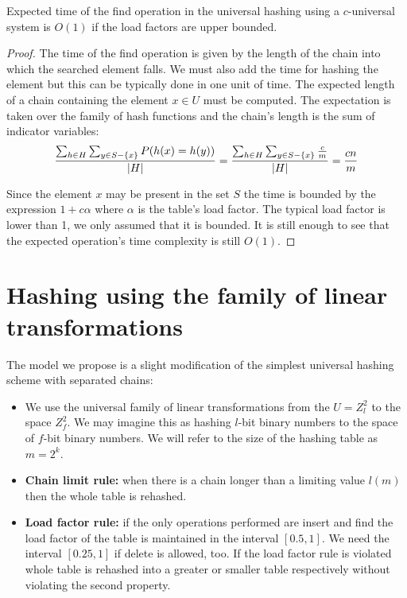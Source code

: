 \begin{theorem}
\label{theorem-expected-chain-length-universal}
Expected time of the find operation in the universal hashing using a $c$-universal system is $O(1)$ if the load factors are upper bounded.
\end{theorem}
\begin{proof}
The time of the find operation is given by the length of the chain into which the searched element falls. We must also add the time for hashing the element but this can be typically done in one unit of time. The expected length of a chain containing the element $x \in U$ must be computed. The expectation is taken over the family of hash functions and the chain's length is the sum of indicator variables:
\begin{displaymath}
\frac{\sum\displaylimits_{h \in H} \sum\displaylimits_{y \in S - \lbrace x \rbrace} P(h(x) = h(y))}{|H|} = \frac{\sum\displaylimits_{h \in H} \sum\displaylimits_{y \in S - \lbrace x \rbrace} \frac{c}{m}}{|H|} = \frac{cn}{m}
\end{displaymath}

Since the element $x$ may be present in the set $S$ the time is bounded by the expression $1 + c\alpha$ where $\alpha$ is the table's load factor. The typical load factor is lower than 1, we only assumed that it is bounded. It is still enough to see that the expected operation's time complexity is still $O(1)$.
\end{proof}

\section{Hashing using the family of linear transformations}

The model we propose is a slight modification of the simplest universal hashing scheme with separated chains:
\begin{itemize}
\item We use the universal family of linear transformations from the $U = Z^2_l$ to the space $Z^2_f$. We may imagine this as hashing $l$-bit binary numbers to the space of $f$-bit binary numbers. We will refer to the size of the hashing table as $m = 2^k$.
\item \textbf{Chain limit rule:} when there is a chain longer than a limiting value $l(m)$ then the whole table is rehashed.
\item \textbf{Load factor rule:} if the only operations performed are insert and find the load factor of the table is maintained in the interval $\left[0.5, 1\right]$. We need the interval $\left[0.25, 1\right]$ if delete is allowed, too. If the load factor rule is violated whole table is rehashed into a greater or smaller table respectively without violating the second property.
\end{itemize}


